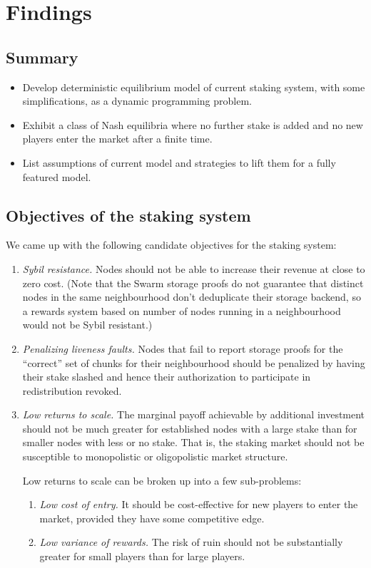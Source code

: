 \newpage
\section*{Findings}


\subsection*{Summary}

\begin{itemize}
  \item Develop deterministic equilibrium model of current staking system, with some simplifications, as a dynamic programming problem.
  \item Exhibit a class of Nash equilibria where no further stake is added and no new players enter the market after a finite time.
  \item List assumptions of current model and strategies to lift them for a fully featured model.
\end{itemize}

\subsection*{Objectives of the staking system}

We came up with the following candidate objectives for the staking system:

\begin{enumerate}
  \item \emph{Sybil resistance.} Nodes should not be able to increase their revenue at close to zero cost. (Note that the Swarm storage proofs do not guarantee that distinct nodes in the same neighbourhood don't deduplicate their storage backend, so a rewards system based on number of nodes running in a neighbourhood would not be Sybil resistant.)
  \item \emph{Penalizing liveness faults.} Nodes that fail to report storage proofs for the ``correct'' set of chunks for their neighbourhood should be penalized by having their stake slashed and hence their authorization to participate in redistribution revoked.
  \item \emph{Low returns to scale.} The marginal payoff achievable by additional investment should not be much greater for established nodes with a large stake than for smaller nodes with less or no stake. That is, the staking market should not be susceptible to monopolistic or oligopolistic market structure.

  Low returns to scale can be broken up into a few sub-problems:
  \begin{enumerate}
    \item \emph{Low cost of entry.} It should be cost-effective for new players to enter the market, provided they have some competitive edge.
    \item \emph{Low variance of rewards.} The risk of ruin should not be substantially greater for small players than for large players.
  \end{enumerate}
\end{enumerate}

